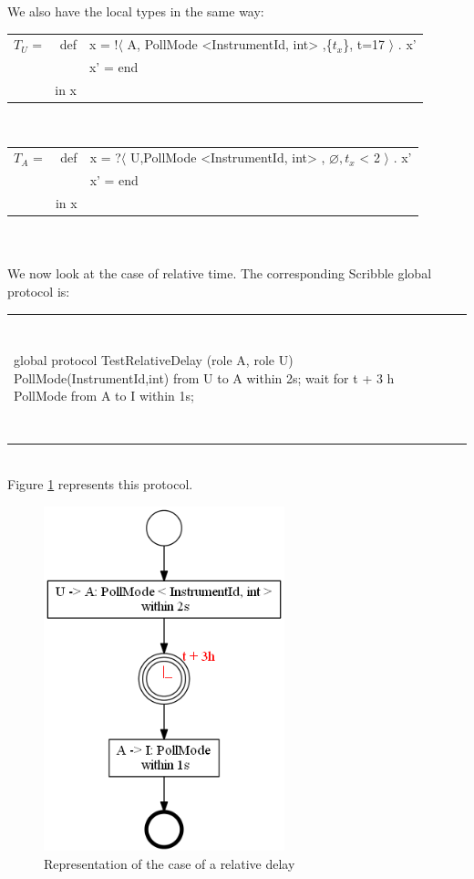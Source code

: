 \documentclass[a4paper,11pt,twoside]{report}
\begin{document}
We also have the local types in the same way:\\
\begin{tabular}{lrl}
$T_{U}$ = & def &  x  = !$\langle$ A, PollMode <InstrumentId, int>  ,\{$t_{x}$\}, t=17 $\rangle$ . x’\\
&& x’ = end\\
& in x&\\
\end{tabular}\\
\begin{tabular}{lrl}
$T_{A}$ = & def &  x  = ?$\langle$ U,PollMode <InstrumentId, int>  , $\varnothing, t_{x}$ < 2 $\rangle$ . x’\\
&& x’ = end\\
& in x&\\
\end{tabular}\\
~~\\

We now look at the case of relative time. The corresponding Scribble global protocol is:\\
\begin{tabular}{ll}
~&~\\
\begin{SJLISTING}
global protocol TestRelativeDelay (role A, role U) {
	PollMode(InstrumentId,int) from U to A within 2s;
	wait for t + 3 h
	PollMode from A to I within 1s;
}
\end{SJLISTING}
&\\
~&~\\
\end{tabular}\\
Figure \ref{fig:rd} represents this protocol.

\begin{figure}[h]
\begin{center}
\includegraphics[height=10cm]{TestRelativeDelay}\caption{Representation of the case of a relative delay}\label{fig:rd}
\end{center}
\end{figure}
\end{document}
